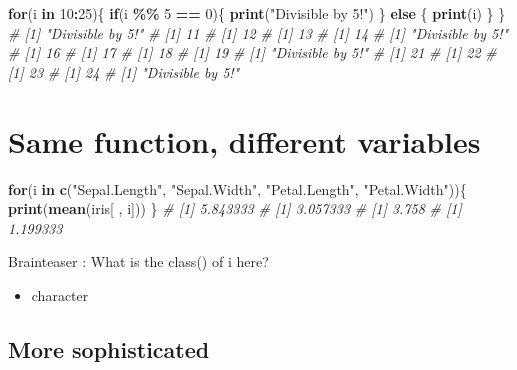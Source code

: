 \documentclass[
]{book}
\newenvironment{Shaded}{\begin{snugshade}}{\end{snugshade}}
\newcommand{\CommentTok}[1]{\textcolor[rgb]{0.56,0.35,0.01}{\textit{#1}}}
\newcommand{\ControlFlowTok}[1]{\textcolor[rgb]{0.13,0.29,0.53}{\textbf{#1}}}
\newcommand{\DecValTok}[1]{\textcolor[rgb]{0.00,0.00,0.81}{#1}}
\newcommand{\FunctionTok}[1]{\textcolor[rgb]{0.13,0.29,0.53}{\textbf{#1}}}
\newcommand{\NormalTok}[1]{#1}
\newcommand{\SpecialCharTok}[1]{\textcolor[rgb]{0.81,0.36,0.00}{\textbf{#1}}}
\newcommand{\StringTok}[1]{\textcolor[rgb]{0.31,0.60,0.02}{#1}}
\providecommand{\tightlist}{%
  \setlength{\itemsep}{0pt}\setlength{\parskip}{0pt}}
\begin{document}
\begin{Shaded}
\begin{Highlighting}[]
\ControlFlowTok{for}\NormalTok{(i }\ControlFlowTok{in} \DecValTok{10}\SpecialCharTok{:}\DecValTok{25}\NormalTok{)\{}
  \ControlFlowTok{if}\NormalTok{(i }\SpecialCharTok{\%\%} \DecValTok{5} \SpecialCharTok{==} \DecValTok{0}\NormalTok{)\{}
    \FunctionTok{print}\NormalTok{(}\StringTok{"Divisible by 5!"}\NormalTok{)}
\NormalTok{  \} }\ControlFlowTok{else}\NormalTok{ \{}
    \FunctionTok{print}\NormalTok{(i) }
\NormalTok{  \}}
\NormalTok{\}}
\CommentTok{\# [1] "Divisible by 5!"}
\CommentTok{\# [1] 11}
\CommentTok{\# [1] 12}
\CommentTok{\# [1] 13}
\CommentTok{\# [1] 14}
\CommentTok{\# [1] "Divisible by 5!"}
\CommentTok{\# [1] 16}
\CommentTok{\# [1] 17}
\CommentTok{\# [1] 18}
\CommentTok{\# [1] 19}
\CommentTok{\# [1] "Divisible by 5!"}
\CommentTok{\# [1] 21}
\CommentTok{\# [1] 22}
\CommentTok{\# [1] 23}
\CommentTok{\# [1] 24}
\CommentTok{\# [1] "Divisible by 5!"}
\end{Highlighting}
\end{Shaded}

\section{Same function, different variables}\label{same-function-different-variables}

\begin{Shaded}
\begin{Highlighting}[]
\ControlFlowTok{for}\NormalTok{(i }\ControlFlowTok{in} \FunctionTok{c}\NormalTok{(}\StringTok{"Sepal.Length"}\NormalTok{, }\StringTok{"Sepal.Width"}\NormalTok{, }\StringTok{"Petal.Length"}\NormalTok{, }\StringTok{"Petal.Width"}\NormalTok{))\{}
  \FunctionTok{print}\NormalTok{(}\FunctionTok{mean}\NormalTok{(iris[ , i]))}
\NormalTok{\}}
\CommentTok{\# [1] 5.843333}
\CommentTok{\# [1] 3.057333}
\CommentTok{\# [1] 3.758}
\CommentTok{\# [1] 1.199333}
\end{Highlighting}
\end{Shaded}

Brainteaser : What is the class() of i here?

\begin{itemize}
\tightlist
\item
  character
\end{itemize}

\subsection{More sophisticated}\label{more-sophisticated}
\end{document}
